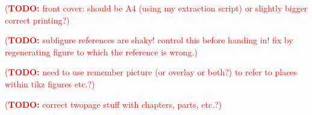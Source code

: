 \documentclass[a4paper,11pt,twoside,openany]{book}
\newcommand\TODO[1]{\textcolor{red}{(\textbf{TODO:} #1)}}
\newcommand{\1}{\mathds{1}}
\begin{document}
\TODO{front cover: should be A4 (using my extraction script) or slightly bigger correct printing?}

\TODO{subfigure references are shaky! control this before handing in! fix by regenerating figure to which the reference is wrong.}

\TODO{need to use remember picture (or overlay or both?) to refer to places within tikz figures etc.?}

\TODO{correct twopage stuff with chapters, parts, etc.?}

\cleartoevenpage %

\end{document}
